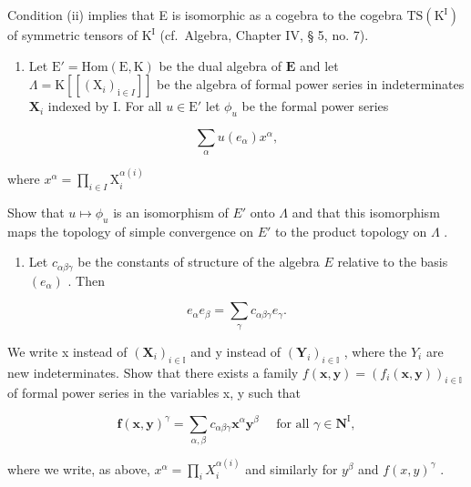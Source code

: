 Condition (ii) implies that E is isomorphic as a cogebra to the cogebra \(\mathrm{TS}(\mathrm{K}^{\mathrm{I}})\) of symmetric tensors of \(\mathrm{K}^{\mathrm{I}}\) (cf.~Algebra, Chapter IV, § 5, no. 7).

\begin{enumerate}
\def\labelenumi{(\alph{enumi})}
\tightlist
\item
  Let \(\mathrm{E}' = \mathrm{Hom}(\mathrm{E},\mathrm{K})\) be the dual algebra of \(\mathbf{E}\) and let \(\Lambda = \mathrm{K}[[(\mathrm{X}_i)_{\mathrm{i}\in I}]]\) be the algebra of formal power series in indeterminates \(\mathbf{X}_i\) indexed by I. For all \(u\in \mathrm{E}'\) let \(\phi_u\) be the formal power series
\end{enumerate}

\[
\sum_ {\alpha} u (e _ {\alpha}) x ^ {\alpha},
\]

where \(x^{\alpha} = \prod_{i\in I}\mathrm{X}_{i}^{\alpha (i)}\)

Show that \(u \mapsto \phi_u\) is an isomorphism of \(E'\) onto \(\Lambda\) and that this isomorphism maps the topology of simple convergence on \(E'\) to the product topology on \(\Lambda\) .

\begin{enumerate}
\def\labelenumi{(\alph{enumi})}
\setcounter{enumi}{1}
\tightlist
\item
  Let \(c_{\alpha \beta \gamma}\) be the constants of structure of the algebra \(E\) relative to the basis \((e_{\alpha})\) . Then
\end{enumerate}

\[
e _ {\alpha} e _ {\beta} = \sum_ {\gamma} c _ {\alpha \beta \gamma} e _ {\gamma}.
\]

We write x instead of \((\mathbf{X}_{i})_{i\in\mathbb{I}}\) and y instead of \((\mathbf{Y}_{i})_{i\in\mathbb{I}}\) , where the \(Y_{i}\) are new indeterminates. Show that there exists a family \(f(\boldsymbol{x},\boldsymbol{y})=(f_{i}(\boldsymbol{x},\boldsymbol{y}))_{i\in\mathbb{I}}\) of formal power series in the variables x, y such that

\[
\boldsymbol {f} (\boldsymbol {x}, \boldsymbol {y}) ^ {\gamma} = \sum_ {\alpha , \beta} c _ {\alpha \beta \gamma} \boldsymbol {x} ^ {\alpha} \boldsymbol {y} ^ {\beta} \quad \text { for   all } \gamma \in \mathbf {N} ^ {\mathrm{I}},
\]

where we write, as above, \(x^{\alpha} = \prod_{i} X_{i}^{\alpha(i)}\) and similarly for \(y^{\beta}\) and \(f(x, y)^{\gamma}\) .

